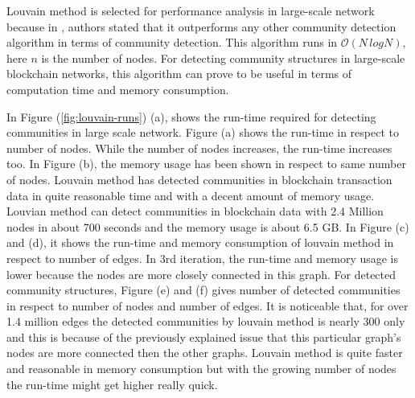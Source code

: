 Louvain method is selected for performance analysis in large-scale network because in \cite{ref-27}, authors stated that it outperforms any other community detection algorithm in terms of community detection. This algorithm runs in $\mathcal{O}(N \, log N)$, here $n$ is the number of nodes. For detecting community structures in large-scale blockchain networks, this algorithm can prove to be useful in terms of computation time and memory consumption.

In Figure (\ref{fig:louvain-runs}) (a), shows the run-time required for detecting communities in large scale network. Figure (a) shows the run-time in respect to number of nodes. While the number of nodes increases, the run-time increases too. In Figure (b), the memory usage has been shown in respect to same number of nodes. Louvain method has detected communities in blockchain transaction data in quite reasonable time and with a decent amount of memory usage. Louvian method can detect communities in blockchain data with 2.4 Million nodes in about 700 seconds and the memory usage is about 6.5 GB. In Figure (c) and (d), it shows the run-time and memory consumption of louvain method in respect to number of edges. In 3rd iteration, the run-time and memory usage is lower because the nodes are more closely connected in this graph. For detected community structures, Figure (e) and (f) gives number of detected communities in respect to number of nodes and number of edges. It is noticeable that, for over 1.4 million edges the detected communities by louvain method is nearly 300 only and this is because of the  previously explained issue that this particular graph's nodes are more connected then the other graphs. Louvain method is quite faster and reasonable in memory consumption but with the growing number of nodes the run-time might get higher really quick.

